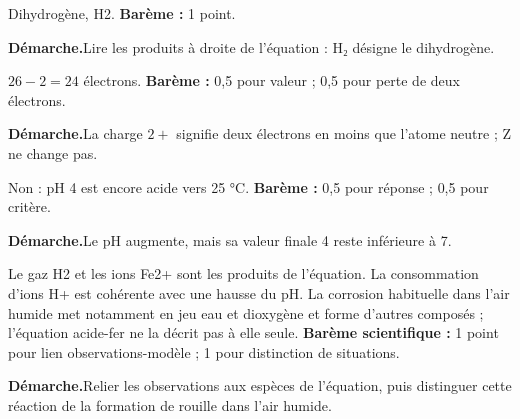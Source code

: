 \par\noindent\begin{minipage}{\linewidth}
Dihydrogène, H2. \textbf{Barème :} 1 point.\par
\smallskip\noindent\textbf{Démarche.}\enspace Lire les produits à droite de l’équation : H₂ désigne le dihydrogène.\par
\end{minipage}\par
\par\noindent\begin{minipage}{\linewidth}
$26-2=24$ électrons. \textbf{Barème :} 0,5 pour valeur ; 0,5 pour perte de deux électrons.\par
\smallskip\noindent\textbf{Démarche.}\enspace La charge $2+$ signifie deux électrons en moins que l’atome neutre ; Z ne change pas.\par
{}
\end{minipage}\par
\par\noindent\begin{minipage}{\linewidth}
Non : pH 4 est encore acide vers 25 °C. \textbf{Barème :} 0,5 pour réponse ; 0,5 pour critère.\par
\smallskip\noindent\textbf{Démarche.}\enspace Le pH augmente, mais sa valeur finale 4 reste inférieure à 7.\par
\end{minipage}\par
\par\noindent\begin{minipage}{\linewidth}
Le gaz H2 et les ions Fe2+ sont les produits de l’équation. La consommation d’ions H+ est cohérente avec une hausse du pH. La corrosion habituelle dans l’air humide met notamment en jeu eau et dioxygène et forme d’autres composés ; l’équation acide-fer ne la décrit pas à elle seule. \textbf{Barème scientifique :} 1 point pour lien observations-modèle ; 1 pour distinction de situations.\par
\smallskip\noindent\textbf{Démarche.}\enspace Relier les observations aux espèces de l’équation, puis distinguer cette réaction de la formation de rouille dans l’air humide.\par
{}
\end{minipage}\par
